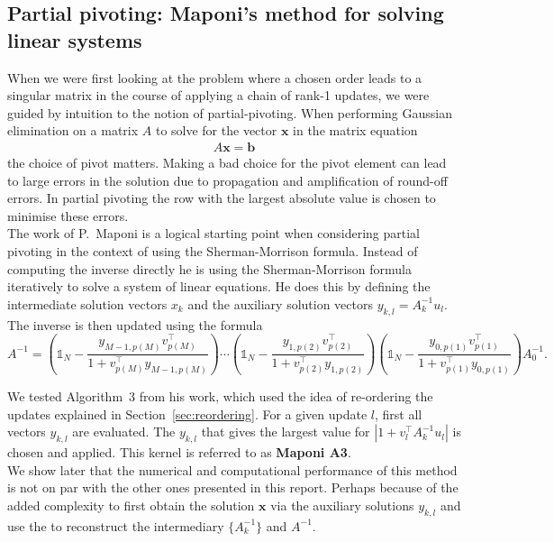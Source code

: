 \documentclass[11pt]{article}
\numberwithin{figure}{section}
\numberwithin{table}{section}
\begin{document}
			\subsection{Partial pivoting: Maponi's method for solving linear systems}
				When we were first looking at the problem where a chosen order leads to a singular matrix in the course of applying a chain of rank-1 updates, we were guided by intuition to the notion of partial-pivoting. When performing Gaussian elimination on a matrix $A$ to solve for the vector $\mathbf{x}$ in the matrix equation
				\begin{align}
					A\mathbf{x}=\mathbf{b}
				\end{align}
				the choice of pivot matters. Making a bad choice for the pivot element can lead to large errors in the solution due to propagation and amplification of round-off errors. In partial pivoting the row with the largest absolute value is chosen to minimise these errors.\\
				
				The work of P.~Maponi\cite{MAPONI2007276} is a logical starting point when considering partial pivoting in the context of using the Sherman-Morrison formula. Instead of computing the inverse directly he is using the Sherman-Morrison formula iteratively to solve a system of linear equations. He does this by defining the intermediate solution vectors $x_k$ and the auxiliary solution vectors $y_{k,l} = A^{-1}_{k}u_l$. The inverse is then updated using the formula
				\begin{equation}\label{eq:Ainv}
	A^{-1} =
		\left(\mathbb{1}_N-\frac{y_{M-1,p(M)}v_{p(M)}^\top }{1+v_{p(M)}^\top y_{M-1,p(M)}}\right)
		\cdots
		\left(\mathbb{1}_N-\frac{y_{1,p(2)}v_{p(2)}^\top }{1+v_{p(2)}^\top y_{1,p(2)}}\right)
		\left(\mathbb{1}_N-\frac{y_{0,p(1)}v_{p(1)}^\top }{1+v_{p(1)}^\top y_{0,p(1)}}\right)
		A_0^{-1}.
\end{equation}
				
				We tested Algorithm~3 from his work, which used the idea of re-ordering the updates explained in Section~\ref{sec:reordering}. For a given update $l$, first all vectors $y_{k,l}$ are evaluated. The $y_{k,l}$ that gives the largest value for $\left|1+v_l^\top A_k^{-1}u_l\right|$ is chosen and applied.  This kernel is referred to as \textbf{Maponi A3}.\\
				
				We show later that the numerical and computational performance of this method is not on par with the other ones presented in this report. Perhaps because of the added complexity to first obtain the solution $\mathbf{x}$ via the auxiliary solutions $y_{k,l}$ and use the to reconstruct the intermediary $\{A_k^{-1}\}$ and $A^{-1}$.\\
				
\end{document}
